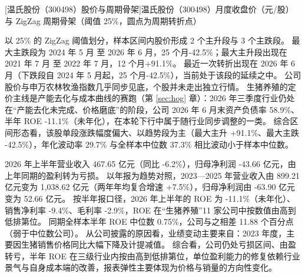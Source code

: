\begin{center}
\begin{minipage}{\textwidth}\centering
{}

[温氏股份（300498）股价与周期骨架]{温氏股份（300498）月度收盘价（元/股）与 ZigZag 周期骨架（阈值 25\%，圆点为周期转折点）}
\end{minipage}
\end{center}

 以 25\% 的 ZigZag 阈值划分，样本区间内股价形成 2 个主升段与 3 个主跌段。 最大主跌段为 2024 年 5 月 至 2026 年 6 月，25 个月-42.5\%；最大主升段出现在 2021 年 7 月 至 2022 年 7 月，12 个月+91.1\%。 最近一次转折出现在 2026 年 6 月（下跌段自 2024 年 5 月起，25 个月-42.5\%），当前处于该段的延续之中。 公司股价与申万农林牧渔指数几乎同步见底，个股并未走出独立行情。 生猪养殖的定价主线是产能去化与成本曲线的赛跑（第 \ref{sec:hog} 章）：2026 年三季度行业仍处在“产能去化未完成、价格磨底”的阶段，公司 2026 年 6 月末资产负债率 58.9\%、半年 ROE -11.1\%（未年化），在本轮下行中属于随行业同步调整的一类。 综合区间形态看，该股单段涨跌幅度偏大、以趋势段为主（最大主升 +91.1\%、最大主跌 -42.5\%），年化波动率 29.7\% 与全样本中位数 37.3\% 相比波动小于样本中位数。

 2026 年上半年营业收入 467.65 亿元（同比 -6.2\%），归母净利润 -43.66 亿元，由上年同期的盈利转为亏损。 以年报为趋势对照，2023---2025 年营业收入由 899.21 亿元变为 1,038.62 亿元（两年年均复合增速 +7.5\%），归母净利润由 -63.90 亿元变为 52.66 亿元。 按半年报口径，2026 年上半年的 ROE 为 -11.1\%（未年化）、销售净利率 -9.4\%、毛利率 -2.9\%，ROE 在“生猪养殖”11 家公司中按数值由高到低排第位。 同期全样本半年 ROE 中位数 0.75\%，公司与之相差 11.88 个百分点（弱于中位数公司）。 从公司披露的原因看，业绩变动主要来自：2023 年度，主要因生猪销售价格同比大幅下降及计提减值。 综合看，公司仍处亏损区间、由盈转亏，半年 ROE 在三级行业内按由高到低排第位，单位盈利能力的修复依赖行业景气与自身成本端的改善，报表弹性主要体现为价格与销量的方向性变化。

